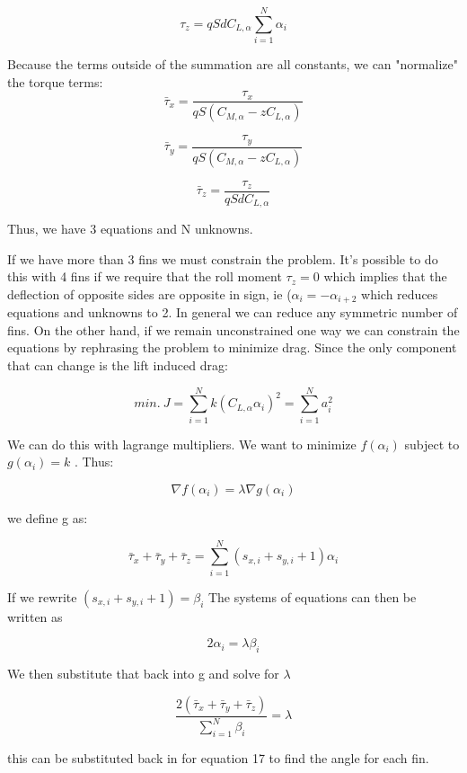 \documentclass[12pt]{article}
\begin{document}
\begin{equation}
  \tau_z = q S d C_{L,\alpha} \sum_{i = 1}^{N} \alpha_i
\end{equation}

Because the terms outside of the summation are all constants, we can "normalize" the torque terms:
\begin{equation}
  \bar{\tau}_x = \frac{\tau_x}{ q S (C_{M,\alpha} - z C_{L,\alpha}) }
\end{equation}

\begin{equation}
  \bar{\tau}_y = \frac{\tau_y}{ q S (C_{M,\alpha} - z C_{L,\alpha}) }
\end{equation}

\begin{equation}
  \bar{\tau}_z = \frac{\tau_z}{ q S d C_{L,\alpha} }
\end{equation}

Thus, we have 3 equations and N unknowns.

If we have more than 3 fins we must constrain the problem. It's possible to do this with 4 fins if we require that the roll moment $\tau_z = 0$ which implies that the deflection of opposite sides are opposite in sign, ie ($\alpha_i = -\alpha_{i+2}$ which reduces equations and unknowns to 2. In general we can reduce any symmetric number of fins. On the other hand, if we remain unconstrained one way we can constrain the equations by rephrasing the problem to minimize drag. Since the only component that can change is the lift induced drag:

\begin{equation}
  min.\: J = \sum_{i = 1}^{N} k (C_{L,\alpha} \alpha_i)^2 = \sum_{i = 1}^{N} a_i^2 
\end{equation}

We can do this with lagrange multipliers. We want to minimize $f(\alpha_i)$ subject to $g(\alpha_i) = k$ . Thus:

\begin{equation}
  \nabla f(\alpha_i) = \lambda \nabla g(\alpha_i)
\end{equation}

we define g as:

\begin{equation}
  \bar{\tau}_x + \bar{\tau}_y + \bar{\tau}_z= \sum_{i = 1}^{N} (s_{x,i} + s_{y,i} + 1)\alpha_i
\end{equation}

If we rewrite $(s_{x,i} + s_{y,i} + 1) = \beta_i$ The systems of equations can then be written as

\begin{equation}
  2 \alpha_i = \lambda \beta_i
\end{equation}

We then substitute that back into g and solve for $\lambda$

\begin{equation}
  \frac{ 2(\bar{\tau}_x + \bar{\tau}_y + \bar{\tau}_z ) }{\sum_{i = 1}^{N} \beta_i} = \lambda
\end{equation}

this can be substituted back in for equation 17 to find the angle for each fin.
\end{document}

